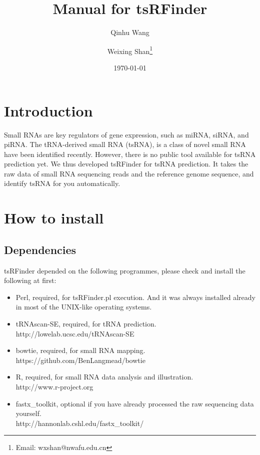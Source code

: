 \documentclass[11pt, a4paper]{article}
\title{Manual for tsRFinder}
\author{Qinhu Wang}
\author{Weixing Shan\thanks{Email: wxshan@nwafu.edu.cn}}
\affil{Northwest A\&F University}
\date{\today}
\begin{document}
\maketitle
\tableofcontents

\section{Introduction}

Small RNAs are key regulators of gene expression, such as miRNA, siRNA, and piRNA. The tRNA-derived small RNA (tsRNA), is a class of novel small RNA have been identified recently. However, there is no public tool available for tsRNA prediction yet. We thus developed tsRFinder for tsRNA prediction. It takes the raw data of small RNA sequencing reads and the reference genome sequence, and identify tsRNA for you automatically.

\section{How to install}

\subsection{Dependencies}

tsRFinder depended on the following programmes, please check and install the following at first:

\begin{itemize}

\item Perl, required, for tsRFinder.pl execution. And it was always installed already in most of the UNIX-like operating systems.
\item tRNAscan-SE, required, for tRNA prediction. \\http://lowelab.ucsc.edu/tRNAscan-SE
\item bowtie, required, for small RNA mapping. \\https://github.com/BenLangmead/bowtie
\item R, required, for small RNA data analysis and illustration. \\http://www.r-project.org
\item fastx\_toolkit, optional if you have already processed the raw sequencing data yourself. \\http://hannonlab.cshl.edu/fastx\_toolkit/

\end{itemize}
\end{document}
